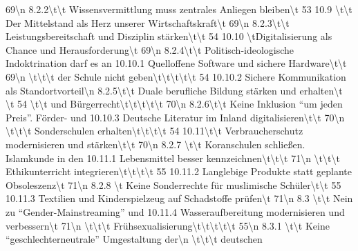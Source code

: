 \documentclass[12pt,]{book}
\newenvironment{Shaded}{\begin{snugshade}}{\end{snugshade}}
\begin{document}
\begin{Shaded}
\begin{Highlighting}[]
69\textbackslash{}n     8.2.2\textbackslash{}t\textbackslash{}t Wissensvermittlung muss zentrales Anliegen bleiben\textbackslash{}t           53   10.9 \textbackslash{}t\textbackslash{}t Der Mittelstand als Herz unserer Wirtschaftskraft\textbackslash{}t    69\textbackslash{}n     8.2.3\textbackslash{}t\textbackslash{}t Leistungsbereitschaft und Disziplin stärken\textbackslash{}t\textbackslash{}t                 54   10.10 \textbackslash{}tDigitalisierung als Chance und Herausforderung\textbackslash{}t        69\textbackslash{}n     8.2.4\textbackslash{}t\textbackslash{}t Politisch-ideologische Indoktrination darf es an                   10.10.1 Quelloffene Software und sichere Hardware\textbackslash{}t\textbackslash{}t           69\textbackslash{}n   \textbackslash{}t\textbackslash{}t\textbackslash{}t der Schule nicht geben\textbackslash{}t\textbackslash{}t\textbackslash{}t\textbackslash{}t\textbackslash{}t                                         54   10.10.2 Sichere Kommunikation als Standortvorteil\textbackslash{}n     8.2.5\textbackslash{}t\textbackslash{}t Duale berufliche Bildung stärken und erhalten\textbackslash{}t \textbackslash{}t              54 \textbackslash{}t\textbackslash{}t          und Bürgerrecht\textbackslash{}t\textbackslash{}t\textbackslash{}t\textbackslash{}t\textbackslash{}t                                70\textbackslash{}n     8.2.6\textbackslash{}t\textbackslash{}t Keine Inklusion “um jeden Preis”. Förder- und                      10.10.3 Deutsche Literatur im Inland digitalisieren\textbackslash{}t\textbackslash{}t         70\textbackslash{}n     \textbackslash{}t\textbackslash{}t\textbackslash{}t      Sonderschulen erhalten\textbackslash{}t\textbackslash{}t\textbackslash{}t\textbackslash{}t                                   54   10.11\textbackslash{}t\textbackslash{}t Verbraucherschutz modernisieren und stärken\textbackslash{}t\textbackslash{}t         70\textbackslash{}n     8.2.7 \textbackslash{}t\textbackslash{}t Koranschulen schließen. Islamkunde in den                         10.11.1 Lebensmittel besser kennzeichnen\textbackslash{}t\textbackslash{}t\textbackslash{}t                   71\textbackslash{}n     \textbackslash{}t\textbackslash{}t\textbackslash{}t      Ethikunterricht integrieren\textbackslash{}t\textbackslash{}t\textbackslash{}t\textbackslash{}t                              55   10.11.2 Langlebige Produkte statt geplante Obsoleszenz\textbackslash{}t       71\textbackslash{}n     8.2.8 \textbackslash{}t Keine Sonderrechte für muslimische Schüler\textbackslash{}t\textbackslash{}t                  55   10.11.3 Textilien und Kinderspielzeug auf Schadstoffe prüfen\textbackslash{}t 71\textbackslash{}n     8.3 \textbackslash{}t\textbackslash{}t Nein zu “Gender-Mainstreaming” und                                  10.11.4 Wasseraufbereitung modernisieren und verbessern\textbackslash{}t      71\textbackslash{}n   \textbackslash{}t\textbackslash{}t\textbackslash{}t        Frühsexualisierung\textbackslash{}t\textbackslash{}t\textbackslash{}t\textbackslash{}t\textbackslash{}t                                      55\textbackslash{}n     8.3.1 \textbackslash{}t\textbackslash{}t Keine “geschlechterneutrale” Umgestaltung der\textbackslash{}n     \textbackslash{}t\textbackslash{}t\textbackslash{}t      deutschen 
\end{Highlighting}
\end{Shaded}
\end{document}
